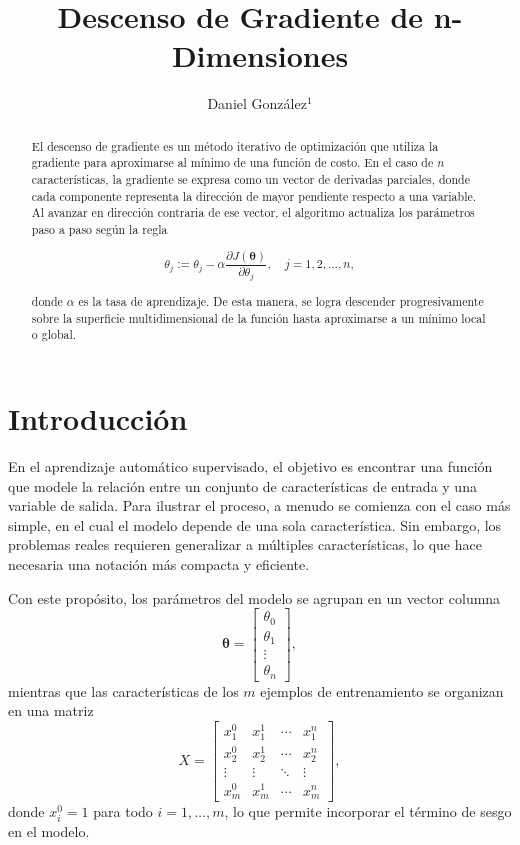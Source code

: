 \documentclass{iopjournal}
\begin{document}

\title{Descenso de Gradiente de n-Dimensiones}

\author{Daniel González$^1$}




\begin{abstract}
El descenso de gradiente es un método iterativo de optimización que utiliza la gradiente para aproximarse al mínimo de una función de costo. En el caso de $n$ características, la gradiente se expresa como un vector de derivadas parciales, donde cada componente representa la dirección de mayor pendiente respecto a una variable. Al avanzar en dirección contraria de ese vector, el algoritmo actualiza los parámetros paso a paso según la regla

\[
\theta_j := \theta_j - \alpha \frac{\partial J(\boldsymbol{\theta})}{\partial \theta_j}, \quad j=1,2,\dots,n,
\]

donde $\alpha$ es la tasa de aprendizaje. De esta manera, se logra descender progresivamente sobre la superficie multidimensional de la función hasta aproximarse a un mínimo local o global.
\end{abstract}

\section{Introducción}

En el aprendizaje automático supervisado, el objetivo es encontrar una función que modele la relación entre un conjunto de características de entrada y una variable de salida. Para ilustrar el proceso, a menudo se comienza con el caso más simple, en el cual el modelo depende de una sola característica. Sin embargo, los problemas reales requieren generalizar a múltiples características, lo que hace necesaria una notación más compacta y eficiente.

Con este propósito, los parámetros del modelo se agrupan en un vector columna
\[
\boldsymbol{\theta} = 
\begin{bmatrix}
\theta_0 \\
\theta_1 \\
\vdots \\
\theta_n
\end{bmatrix},
\]
mientras que las características de los $m$ ejemplos de entrenamiento se organizan en una matriz
\[
X = 
\begin{bmatrix}
x_1^0 & x_1^1 & \cdots & x_1^n \\
x_2^0 & x_2^1 & \cdots & x_2^n \\
\vdots & \vdots & \ddots & \vdots \\
x_m^0 & x_m^1 & \cdots & x_m^n
\end{bmatrix},
\]
donde $x_i^0 = 1$ para todo $i = 1, \dots, m$, lo que permite incorporar el término de sesgo en el modelo.
\end{document}
